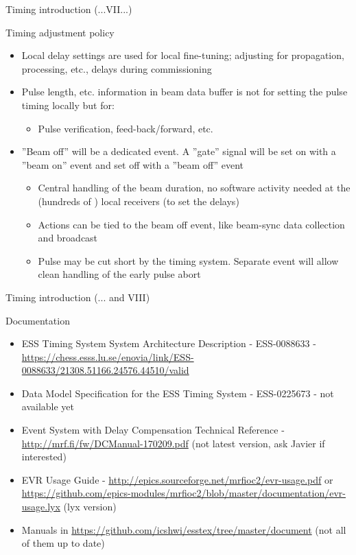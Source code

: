 \documentclass[
  9pt
  , table
  , ignorenonframetext
]{beamer}
\begin{document}
\begin{frame}{Timing introduction (...VII...)}
  \begin{block}{Timing adjustment policy}
    \begin{itemize}
      \item Local delay settings are used for local fine-tuning; adjusting for propagation, processing, etc., delays during commissioning
      \item Pulse length, etc. information in beam data buffer is not for setting the pulse timing locally but for:
      \begin{itemize}
        \item Pulse verification, feed-back/forward, etc.
      \end{itemize}
      \item ”Beam off” will be a dedicated event. A ”gate” signal will be set on with a ”beam on” event and set off with a ”beam off” event
      \begin{itemize}
        \item Central handling of the beam duration, no software activity needed at the (hundreds of ) local receivers (to set the delays)
        \item Actions can be tied to the beam off event, like beam-sync data collection and broadcast
        \item Pulse may be cut short by the timing system. Separate event will allow clean handling of the early pulse abort
      \end{itemize}
    \end{itemize}
  \end{block}
\end{frame}

\begin{frame}{Timing introduction (... and VIII)}
  \begin{block}{Documentation}
    \begin{itemize}
      \item ESS Timing System System Architecture Description - ESS-0088633 - \url{https://chess.esss.lu.se/enovia/link/ESS-0088633/21308.51166.24576.44510/valid}
      \item Data Model Specification for the ESS Timing System - ESS-0225673 - not available yet
      \item Event System with Delay Compensation Technical Reference - \url{http://mrf.fi/fw/DCManual-170209.pdf} (not latest version, ask Javier if interested)
      \item EVR Usage Guide - \url{http://epics.sourceforge.net/mrfioc2/evr-usage.pdf} or \url{https://github.com/epics-modules/mrfioc2/blob/master/documentation/evr-usage.lyx} (lyx version)
      \item Manuals in \url{https://github.com/icshwi/esstex/tree/master/document} (not all of them up to date)
    \end{itemize}
  \end{block}
\end{frame}
\end{document}
